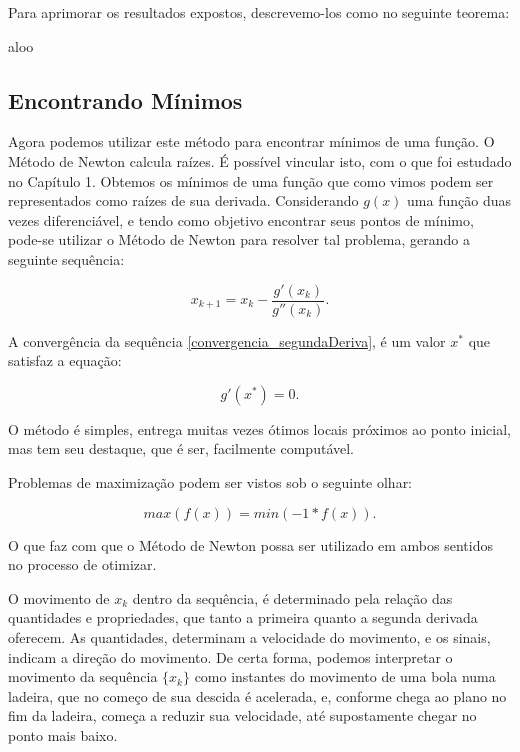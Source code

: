 Para aprimorar os resultados expostos, descrevemo-los como no seguinte teorema:

aloo


\subsection{Encontrando Mínimos}

\hspace{0.8cm}
Agora podemos utilizar este método para encontrar mínimos de uma função.
O Método de Newton calcula raízes. É possível vincular isto, com o que
foi estudado no Capítulo 1. Obtemos os mínimos de uma função que como vimos
podem ser representados como raízes de sua derivada. Considerando $g(x)$ uma
função duas vezes diferenciável, e tendo como objetivo encontrar seus pontos
de mínimo, pode-se utilizar o Método de Newton para resolver tal problema,
gerando a seguinte sequência:


\begin{equation}
    x_{k+1} = x_{k} - \frac {g'(x_{k})}{g''(x_{k})}.
    \label{convergencia_segundaDeriva}
\end{equation}

A convergência da sequência \ref{convergencia_segundaDeriva}, é um valor $x^*$
que satisfaz a equação:

\begin{equation}
    g'(x^*) = 0.
\end{equation}

O método é simples, entrega muitas vezes ótimos locais próximos ao ponto
inicial, mas tem seu destaque, que é ser, facilmente computável.

Problemas de maximização podem ser vistos sob o seguinte olhar:

\begin{equation}
    max(f(x)) = min(-1 * f(x)).
\end{equation}

O que faz com que o Método de Newton possa ser utilizado em ambos sentidos no
processo de otimizar.

O movimento de \(x_k\) dentro da sequência, é determinado pela relação das
quantidades e propriedades, que tanto a primeira quanto a segunda derivada
oferecem. As quantidades, determinam a velocidade do movimento, e os sinais,
indicam a direção do movimento. De certa forma, podemos interpretar o movimento
da sequência \(\{x_k\}\) como instantes do movimento de uma bola numa ladeira,
que no começo de sua descida é acelerada, e, conforme chega ao plano no fim da
ladeira, começa a reduzir sua velocidade, até supostamente chegar no ponto mais
baixo.


